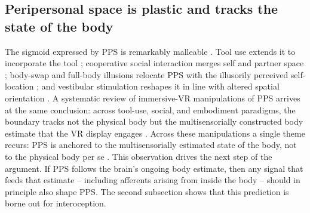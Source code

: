 \subsection{Peripersonal space is plastic and tracks the state of the body}


The sigmoid expressed by PPS is remarkably malleable \citep{Serino2019, Bufacchi2018, noel_2021, karakoc_2025}. Tool use extends it to incorporate the tool \citep{iriki1996coding, maravita2004tools}; cooperative social interaction merges self and partner space \citep{teneggi2013social}; body-swap and full-body illusions relocate PPS with the illusorily perceived self-location \citep{noel2015peripersonal, noel2015fullbody}; and vestibular stimulation reshapes it in line with altered spatial orientation \citep{pfeiffer2018vestibular}. A systematic review of immersive-VR manipulations of PPS arrives at the same conclusion: across tool-use, social, and embodiment paradigms, the boundary tracks not the physical body but the multisensorially constructed body estimate that the VR display engages \citep{karakoc_2025}. Across these manipulations a single theme recurs: PPS is anchored to the multisensorially estimated state of the body, not to the physical body per se \citep{blanke2015behavioral, Grivaz2017, serino2015bodypart, noel_2021}. This observation drives the next step of the argument. If PPS follows the brain's ongoing body estimate, then any signal that feeds that estimate -- including afferents arising from inside the body -- should in principle also shape PPS. The second subsection shows that this prediction is borne out for interoception.

